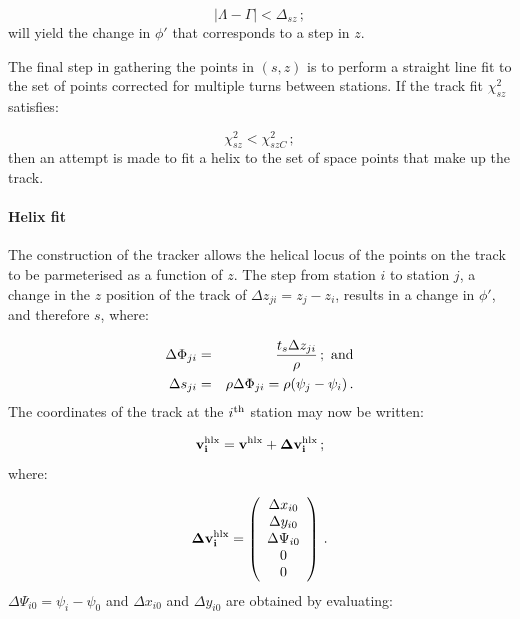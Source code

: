 \begin{equation}
  | \Lambda - \Gamma | < \Delta_{sz} \, ;
\end{equation} 
will yield the change in $\phi'$ that corresponds to a step in $z$. 

The final step in gathering the points in $(s, z)$ is to perform a straight line fit to the set of points corrected for multiple turns between stations.  If the track fit $\chi^2_{sz}$ satisfies: 

\begin{equation}
  \chi^2_{sz} < \chi^2_{szC} \, ;
\end{equation}
then an attempt is made to fit a helix to the set of space points that make up the track.

\paragraph{Helix fit}

The construction of the tracker allows the helical locus of the points on the track to be parmeterised as a function of $z$. The step from station $i$ to station $j$, a change in the $z$ position of the track of $\Delta z_{ji} = z_j - z_i$, results in a change in $\phi'$, and therefore $s$, where:

\begin{eqnarray}
  \Delta \Phi_{ji} & = & \frac{t_s \Delta z_{ji}}{\rho} \, ; {\rm~and}  \\
  \Delta s_{ji}    & = & \rho \Delta \Phi_{ji} 
                    =    \rho (\psi_j - \psi_i) \, .
\end{eqnarray}
The coordinates of the track at the $i^{\rm th}$ station may now be written:

\begin{equation}
  {\bf v^{\rm hlx}_i} = {\bf v^{\rm hlx}} + {\bf \Delta v^{\rm hlx}_i} \, ;
\end{equation}
where:

\begin{equation}
  {\bf \Delta v^{\rm hlx}_i} =
    \left( 
      \begin{array}{c}
        \Delta x_{i0}    \\
        \Delta y_{i0}    \\
        \Delta \Psi_{i0} \\
        0                \\
        0
      \end{array}
    \right) \, .
\end{equation}
$\Delta \Psi_{i0} = \psi_i - \psi_0$ and $\Delta x_{i0}$ and $\Delta y_{i0}$ are obtained by evaluating:

